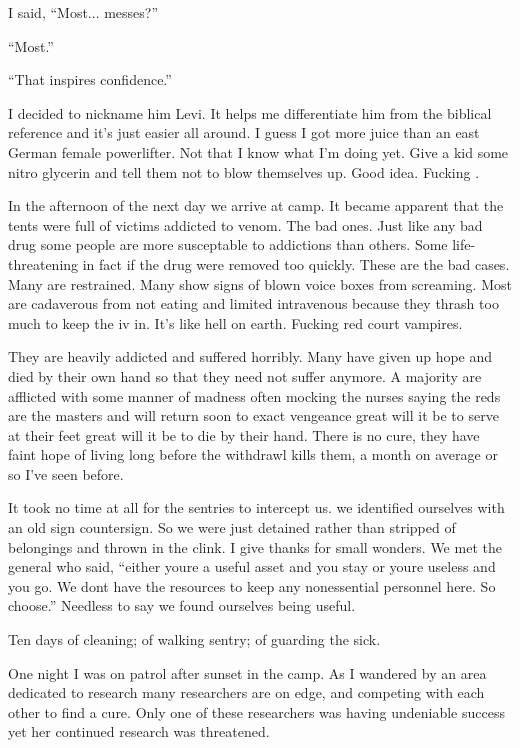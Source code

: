 I said, ``Most... messes?''

``Most.''

``That inspires confidence.''

I decided to nickname him Levi. It helps me differentiate him from the biblical reference and it's just easier all around. I guess I got more juice than an east German female powerlifter. Not that I know what I'm doing yet. Give a kid some nitro glycerin and tell them not to blow themselves up. Good idea. Fucking \chichenitza{}.

\parasep

In the afternoon of the next day we arrive at camp. It became apparent that the tents were full of victims addicted to venom. The bad ones. Just like any bad drug some people are more susceptable to addictions than others. Some life-threatening in fact if the drug were removed too quickly. These are the bad cases. Many are restrained. Many show signs of blown voice boxes from screaming. Most are cadaverous from not eating and limited intravenous because they thrash too much to keep the iv in. It's like hell on earth. Fucking red court vampires.


They are heavily addicted and suffered horribly. Many have given up hope and died by their own hand so that they need not suffer anymore. A majority are afflicted with some manner of madness often mocking the nurses saying the reds are the masters and will return soon to exact vengeance great will it be to serve at their feet great will it be to die by their hand. There is no cure, they have faint hope of living long before the withdrawl kills them, a month on average or so I've seen before.

It took no time at all for the sentries to intercept us. we identified ourselves with an old sign countersign. So we were just detained rather than stripped of belongings and thrown in the clink. I give thanks for small wonders. We met the general who said, ``either youre a useful asset and you stay or youre useless and you go. We dont have the resources to keep any nonessential personnel here. So choose.'' Needless to say we found ourselves being useful.

Ten days of cleaning; of walking sentry; of guarding the sick.

One night I was on patrol after sunset in the camp. As I wandered by an area dedicated to research many researchers are on edge, and competing with each other to find a cure. Only one of these researchers was having undeniable success yet her continued research was threatened.

